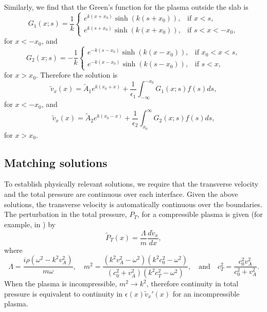 \documentclass{aastex61}
\begin{document}
Similarly, we find that the Green's function for the plasma outside the slab is 
\begin{equation}
G_1(x;s) = \frac{1}{k}
\begin{cases}
e^{k(x + x_0)}\sinh(k(s + x_0)), & \text{if } x < s, \\
e^{k(s + x_0)}\sinh(k(x + x_0)), & \text{if } s < x < -x_0,
\end{cases}
\end{equation}
for $x < -x_0$, and
\begin{equation}
G_2(x;s) = -\frac{1}{k}
\begin{cases}
e^{-k(s - x_0)}\sinh(k(x - x_0)), & \text{if } x_0 < x < s, \\
e^{-k(x - x_0)}\sinh(k(s - x_0)), & \text{if } s < x,
\end{cases}
\end{equation}
for $x > x_0$. Therefore the solution is
\begin{equation}
\tilde{v}_x(x) = \tilde{A}_1e^{k(x_0 + x)} + \frac{1}{\epsilon_1}\int_{-\infty}^{-x_0} G_1(x;s) f(s) ds,
\end{equation}
for $x < -x_0$, and
\begin{equation}
\tilde{v}_x(x) = \tilde{A}_2e^{k(x_0 - x)} + \frac{1}{\epsilon_2}\int_{x_0}^{\infty} G_2(x;s) f(s) ds,
\end{equation}
for $x > x_0$.


\subsection{Matching solutions}
To establish physically relevant solutions, we require that the transverse velocity and the total pressure are continuous over each interface. Given the above solutions, the transverse velocity is automatically continuous over the boundaries. The perturbation in the total pressure, $P_T$, for a compressible plasma is given (for example, in \cite{all_etal17}) by
\begin{equation}
\tilde{P}_T(x) = \frac{\Lambda}{m}\frac{d\tilde{v}_x}{d x},
\end{equation}
where
\begin{equation}
\Lambda = \frac{i\rho(\omega^2 - k^2v_A^2)}{m\omega},
\quad
m^2 = \frac{(k^2v_A^2 - \omega^2)(k^2c_0^2 - \omega^2)}{(c_0^2 + v_A^2)(k^2c_T^2 - \omega^2)},
\quad \text{and} \quad
c_T^2 = \frac{c_0^2 v_A^2}{c_0^2 + v_A^2}.
\end{equation}
When the plasma is incompressible, $m^2 \to k^2$, therefore continuity in total pressure is equivalent to continuity in $\epsilon(x)\tilde{v}_x'(x)$ for an incompressible plasma.
\end{document}
